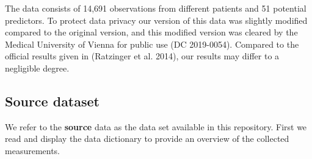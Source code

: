 \documentclass[
  letterpaper,
  DIV=11,
  numbers=noendperiod]{scrreport}
\begin{document}
The data consists of 14,691 observations from different patients and 51
potential predictors. To protect data privacy our version of this data
was slightly modified compared to the original version, and this
modified version was cleared by the Medical University of Vienna for
public use (DC 2019-0054). Compared to the official results given in
(Ratzinger et al. 2014), our results may differ to a negligible degree.

\hypertarget{source-dataset}{%
\subsection{Source dataset}\label{source-dataset}}

We refer to the \textbf{source} data as the data set available in this
repository. First we read and display the data dictionary to provide an
overview of the collected measurements.
\end{document}
